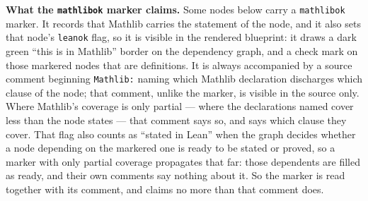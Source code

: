 \noindent\textbf{What the \texttt{mathlibok} marker claims.}
Some nodes below carry a \texttt{mathlibok} marker.  It records that Mathlib carries the
statement of the node, and it also sets that node's \texttt{leanok} flag, so it is visible in
the rendered blueprint: it draws a dark green ``this is in Mathlib'' border on the dependency
graph, and a check mark on those markered nodes that are definitions.  It is always
accompanied by a source comment beginning \texttt{Mathlib:} naming which Mathlib declaration
discharges which clause of the node; that comment, unlike the marker, is visible in the source
only.  Where Mathlib's coverage is only partial --- where the declarations named cover less
than the node states --- that comment says so, and says which clause they cover.  That
flag also counts as ``stated in Lean'' when the graph decides whether a node depending
on the markered one is ready to be stated or proved, so a marker with only partial
coverage propagates that far: those dependents are filled as ready, and their own
comments say nothing about it.  So the marker is read together with its comment, and
claims no more than that comment does.
%
%
%
%
